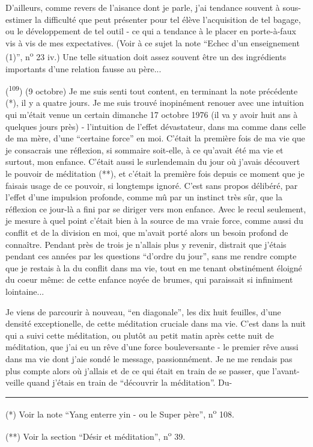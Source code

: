 
D'ailleurs, comme revers de l'aisance dont je parle, j'ai tendance souvent à sous-estimer la difficulté que peut présenter pour tel élève l'acquisition de tel bagage, ou le développement de tel outil - ce qui a tendance à le placer en porte-à-faux vis à vis de mes expectatives. (Voir à ce sujet la note ``Echec d'un enseignement (1)'', n\textsuperscript{o} 23 iv.) Une telle situation doit assez souvent être un des ingrédients importants d'une relation fausse au père...

(\textsuperscript{109}) (9 octobre) Je me suis senti tout content, en terminant la note précédente (*), il y a quatre jours. Je me suis trouvé inopinément renouer avec une intuition qui m'était venue un certain dimanche 17 octobre 1976 (il va y avoir huit ans à quelques jours près) - l'intuition de l'effet dévastateur, dans ma  comme dans celle de ma mère, d'une ``certaine force'' en moi. C'était la première fois de ma vie que je consacrais une réflexion, si sommaire soit-elle, à ce qu'avait été ma vie et surtout, mon enfance. C'était aussi le surlendemain du jour où j'avais découvert le pouvoir de méditation (**), et c'était la première fois depuis ce moment que je faisais usage de ce pouvoir, si longtemps ignoré. C'est sans propos délibéré, par l'effet d'une impulsion profonde, comme mû par un instinct très sûr, que la réflexion ce jour-là a fini par se diriger vers mon enfance. Avec le recul seulement, je mesure à quel point c'était bien à la source de ma vraie force, comme aussi du conflit et de la division en moi, que m'avait porté alors un besoin profond de connaître. Pendant près de trois  je n'allais plus y revenir, distrait que j'étais pendant ces années par les  questions ``d'ordre du jour'', sans me rendre compte que je restais à la  du conflit dans ma vie, tout en me tenant obstinément éloigné du coeur même: de cette enfance noyée de brumes, qui paraissait si infiniment lointaine...

Je viens de parcourir à nouveau, ``en diagonale'', les dix huit feuilles, d'une densité exceptionelle, de cette méditation cruciale dans ma vie. C'est dans la nuit qui a suivi cette méditation, ou plutôt au petit matin après cette nuit de méditation, que j'ai eu un rêve d'une force bouleversante - le premier rêve aussi dans ma vie dont j'aie sondé le message, passionnément. Je ne me rendais pas plus compte alors où j'allais et de ce qui était en train de se passer, que l'avant-veille quand j'étais en train de ``découvrir la méditation''. Du-

\noindent\rule{5em}{0.3pt}\par
(*) Voir la note ``Yang enterre yin - ou le Super père'', n\textsuperscript{o} 108.

(**) Voir la section ``Désir et méditation'', n\textsuperscript{o} 39.

